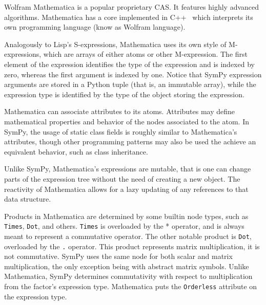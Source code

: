 
Wolfram Mathematica is a popular proprietary CAS.\@
It features highly advanced algorithms.
Mathematica has a core implemented in C++~\cite{Wolfram2016}
which interprets its own programming language (know as Wolfram language).


Analogously to Lisp's S-expressions,
Mathematica uses its own style of M-expressions,
which are arrays of either atoms or other M-expression.
The first element of the expression identifies the type of the expression
and is indexed by zero, whereas the first argument is indexed by one.
Notice that SymPy expression arguments are stored in a Python tuple
(that is, an immutable array),
while the expression type is identified by the type of the object storing the
expression.


Mathematica can associate attributes to its atoms.
Attributes may define mathematical properties and behavior of the nodes
associated to the atom.
In SymPy, the usage of static class fields is roughly similar to Mathematica's
attributes, though other programming patterns may also be used the achieve an
equivalent behavior, such as class inheritance.


Unlike SymPy, Mathematica's expressions are mutable,
that is one can change parts of the expression tree without the need of
creating a new object.
The reactivity of Mathematica allows for a lazy updating of any references
to that data structure.


Products in Mathematica are determined by some builtin node types,
such as \texttt{Times}, \texttt{Dot}, and others.
\texttt{Times} is overloaded by the * operator,
and is always meant to represent a commutative operator.
The other notable product is \texttt{Dot}, overloaded by the \texttt{.} operator.
This product represents matrix multiplication,
it is not commutative.
SymPy uses the same node for both scalar and matrix multiplication,
the only exception being with abstract matrix symbols.
Unlike Mathematica, SymPy determines commutativity with respect to
multiplication from the factor's expression type.
Mathematica puts the \texttt{Orderless} attribute on the expression
type.


